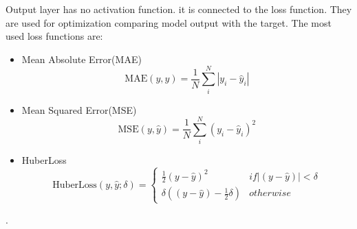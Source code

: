 Output layer has no activation function. it is connected to the loss function. They are used for optimization comparing model output with the target.  The most used loss functions are:
\begin{itemize}
	\item Mean Absolute Error(MAE)
	\begin{equation}
		\text{MAE}(y,\hat{y}) = \frac{1}{N}\sum^N_i \left|y_i-\hat{y}_i\right|
	\end{equation}
	
	\item Mean Squared Error(MSE)
	\begin{equation}
		\text{MSE}(y,\hat{y}) = \frac{1}{N}\sum^N_i \left(y_i-\hat{y}_i\right)^2
	\end{equation}
	
	\item HuberLoss
	\begin{equation}
		\text{HuberLoss}(y,\hat{y};\delta) = \left\{\begin{matrix}
			\frac{1}{2}(y - \hat{y})^{2} & if \left | (y - \hat{y})  \right | < \delta\\
			\delta ((y - \hat{y}) - \frac1 2 \delta) & otherwise
		\end{matrix}\right.
	\end{equation}
	
\end{itemize}.



